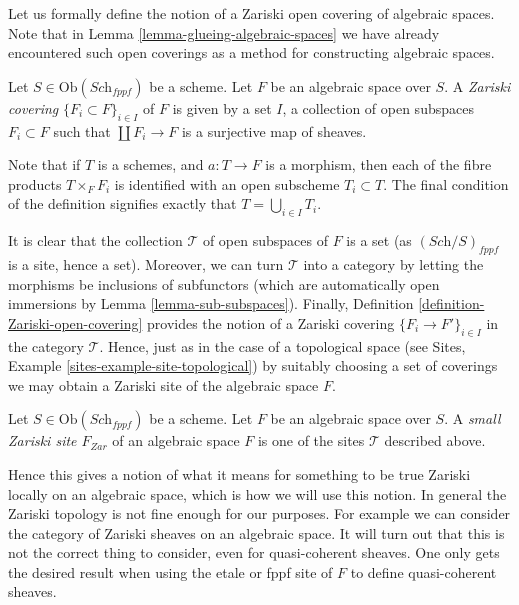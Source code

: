\noindent
Let us formally define the notion of a Zariski open covering of
algebraic spaces. Note that in Lemma \ref{lemma-glueing-algebraic-spaces}
we have already encountered such open coverings as a method for
constructing algebraic spaces.

\begin{definition}
\label{definition-Zariski-open-covering}
Let $S \in \text{Ob}(\textit{Sch}_{fppf})$ be a scheme.
Let $F$ be an algebraic space over $S$.
A {\it Zariski covering} $\{F_i \subset F\}_{i \in I}$ of $F$
is given by a set $I$, a collection of open subspaces
$F_i \subset F$ such that $\coprod F_i \to F$ is a surjective
map of sheaves.
\end{definition}

\noindent
Note that if $T$ is a schemes,
and $a : T \to F$ is a morphism, then each of the fibre products
$T \times_F F_i$ is identified with an open subscheme
$T_i \subset T$. The final condition of the definition signifies
exactly that $T = \bigcup_{i \in I} T_i$.

\medskip\noindent
It is clear that the collection $\mathcal{T}$ of open subspaces of
$F$ is a set (as $(\textit{Sch}/S)_{fppf}$ is a site, hence a set).
Moreover, we can turn $\mathcal{T}$ into a category by letting the
morphisms be inclusions of subfunctors (which are automatically open
immersions by Lemma \ref{lemma-sub-subspaces}). Finally,
Definition \ref{definition-Zariski-open-covering}
provides the notion of a Zariski covering $\{F_i \to F'\}_{i \in I}$
in the category $\mathcal{T}$. Hence, just as in the case of a topological
space (see Sites, Example \ref{sites-example-site-topological})
by suitably choosing a set of coverings
we may obtain a Zariski site of the algebraic space $F$.

\begin{definition}
\label{definition-small-Zariski-site}
Let $S \in \text{Ob}(\textit{Sch}_{fppf})$ be a scheme.
Let $F$ be an algebraic space over $S$. A {\it small Zariski site $F_{Zar}$} of
an algebraic space $F$ is one of the sites $\mathcal{T}$ described above.
\end{definition}

\noindent
Hence this gives a notion of what it means for something to be true
Zariski locally on an algebraic space, which is how we will use this
notion. In general the Zariski topology is not fine enough for our
purposes. For example we can consider the category of Zariski sheaves
on an algebraic space. It will turn out that this is not the
correct thing to consider, even for quasi-coherent sheaves.
One only gets the desired result when using the etale or fppf site of
$F$ to define quasi-coherent sheaves.












